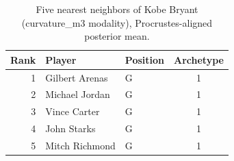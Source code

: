 \begin{table}[htbp]
  \centering\small
  \begin{tabular}{rllc}
    \toprule
    Rank & Player & Position & Archetype \\
    \midrule
    1 & Gilbert Arenas & G & 1 \\
    2 & Michael Jordan & G & 1 \\
    3 & Vince Carter & G & 1 \\
    4 & John Starks & G & 1 \\
    5 & Mitch Richmond & G & 1 \\
    \bottomrule
  \end{tabular}
  \caption{Five nearest neighbors of Kobe Bryant (curvature_m3 modality), Procrustes-aligned posterior mean.}
  \label{tab:Kobe_Bryant_neighbors_curvature_m3}
\end{table}

